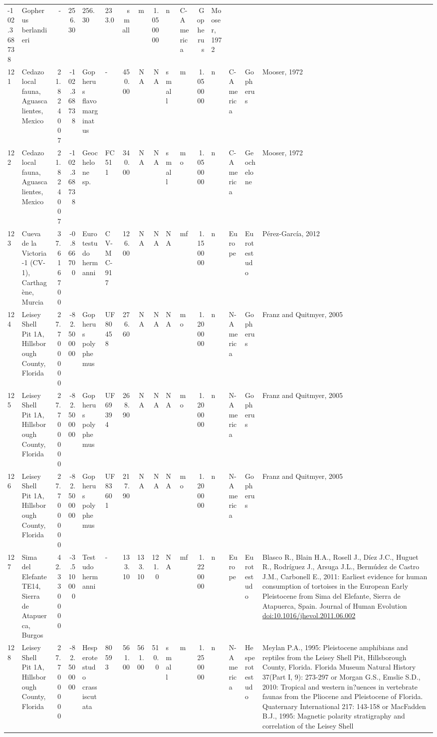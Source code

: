 \documentclass[]{article}
\begin{document}
\begin{longtable}[]{@{}llrrllrrrllrllll@{}}
-102.368738 & Gopherus berlandieri & - & 256.30 & 256.30 & 233.0 & small
& m & 1.050000 & n & C-America & Gopherus & Mooser, 1972\tabularnewline
121 & Cedazo local fauna, Aguascalientes, Mexico & 21.824007 &
-102.368738 & Gopherus flavomarginatus & - & 450.00 & NA & NA & small &
m & 1.050000 & n & C-America & Gopherus & Mooser, 1972\tabularnewline
122 & Cedazo local fauna, Aguascalientes, Mexico & 21.824007 &
-102.368738 & Geochelone sp. & FC 511 & 340.00 & NA & NA & small & mo &
1.050000 & n & C-America & Geochelone & Mooser, 1972\tabularnewline
123 & Cueva de la Victoria-1 (CV-1), Carthagène, Murcia & 37.616700 &
-0.866700 & Eurotestudo hermanni & CV-MC-917 & 126.00 & NA & NA & NA &
mf & 1.150000 & n & Europe & Eurotestudo & Pérez-García,
2012\tabularnewline
124 & Leisey Shell Pit 1A, Hillsborough County, Florida & 27.700000 &
-82.500000 & Gopherus polyphemus & UF 80458 & 276.60 & NA & NA & NA & mo
& 1.200000 & n & N-America & Gopherus & Franz and Quitmyer,
2005\tabularnewline
125 & Leisey Shell Pit 1A, Hillsborough County, Florida & 27.700000 &
-82.500000 & Gopherus polyphemus & UF 69394 & 268.90 & NA & NA & NA & mo
& 1.200000 & n & N-America & Gopherus & Franz and Quitmyer,
2005\tabularnewline
126 & Leisey Shell Pit 1A, Hillsborough County, Florida & 27.700000 &
-82.500000 & Gopherus polyphemus & UF 83601 & 217.90 & NA & NA & NA & mo
& 1.200000 & n & N-America & Gopherus & Franz and Quitmyer,
2005\tabularnewline
127 & Sima del Elefante TE14, Sierra de Atapuerca, Burgos & 42.330000 &
-3.510000 & Testudo hermanni & - & 133.10 & 133.10 & 121.0 & NA & mf &
1.220000 & n & Europe & Eurotestudo & Blasco R., Blain H.A., Rosell J.,
Díez J.C., Huguet R., Rodríguez J., Arsuga J.L., Bermúdez de Castro
J.M., Carbonell E., 2011: Earliest evidence for human consumption of
tortoises in the European Early Pleistocene from Sima del Elefante,
Sierra de Atapuerca, Spain. Journal of Human Evolution
\url{doi:10.1016/jhevol.2011.06.002}\tabularnewline
128 & Leisey Shell Pit 1A, Hillsborough County, Florida & 27.700000 &
-82.500000 & Hesperotestudo crassiscutata & 80593 & 561.00 & 561.00 &
510.0 & small & m & 1.250000 & n & N-America & Hesperotestudo & Meylan
P.A., 1995: Pleistocene amphibians and reptiles from the Leisey Shell
Pit, Hillsborough County, Florida. Florida Museum Natural History
37(Part I, 9): 273-297 or Morgan G.S., Emslie S.D., 2010: Tropical and
western in?uences in vertebrate faunas from the Pliocene and Pleistocene
of Florida. Quaternary International 217: 143-158 or MacFadden B.J.,
1995: Magnetic polarity stratigraphy and correlation of the Leisey Shell

\end{longtable}
\end{document}
